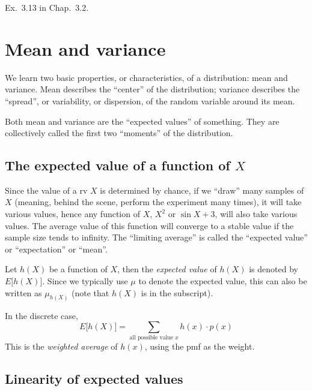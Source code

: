 \documentclass[12pt]{article}
\begin{document}
\example
Ex.~3.13 in Chap.~3.2.



\section{Mean and variance}

We learn two basic properties, or characteristics,
of a distribution: mean and variance.
Mean describes the ``center'' of the distribution;
variance describes the ``spread'', or variability, or dispersion,
of the random variable around its mean.

Both mean and variance are the ``expected values'' of something.
They are collectively called the first two ``moments'' of the
distribution.


\subsection{The expected value of a function of $X$}

Since the value of a rv $X$ is determined by chance,
if we ``draw'' many samples of $X$
(meaning, behind the scene, perform the experiment many times),
it will take various values, hence any function of $X$,
\eg $X^2$ or $\sin X + 3$, will also take various values.
The average value of this function will converge to a stable value if
the sample size tends to infinity.
The ``limiting average'' is called the ``expected value'' or
``expectation'' or ``mean''.

Let $h(X)$ be a function of $X$, then the \emph{expected value}
of $h(X)$ is denoted by $E\bigl[h(X)\bigr]$.
Since we typically use $\mu$ to denote the expected value,
this can also be written as $\mu_{h(X)}$
(note that $h(X)$ is in the subscript).

In the discrete case,
\begin{equation}\label{eq:E[h(X)]-disc}
E\bigl[h(X)\bigr] = \sum_{\text{all possible value $x$}}  h(x)\cdot p(x)
\end{equation}
This is the \emph{weighted average} of $h(x)$,
using the pmf as the weight.



\subsection{Linearity of expected values}
\end{document}
